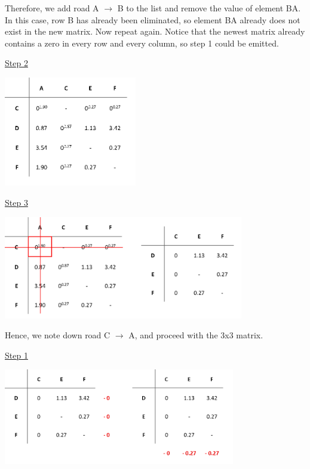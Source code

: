 \noindent
Therefore, we add road A $\rightarrow$ B to the list and remove the value of element BA. In this case, row B has already been eliminated, so element BA already does not exist in the new matrix. Now repeat again. Notice that the newest matrix already contains a zero in every row and every column, so step 1 could be emitted.

\vspace{5mm}
\underline{Step 2}
\vspace{-3mm}
\begin{center}
	\includegraphics[height=4.8cm]{3pen}
\end{center}	

\underline{Step 3}
\vspace{-2mm}
\begin{center}
	\includegraphics[height=4.5cm]{3elim4}
\end{center}

\noindent
Hence, we note down road C $\rightarrow$ A, and proceed with the 3x3 matrix.


\vspace{5mm}
\underline{Step 1} 

\begin{center}
	\includegraphics[height=4.2cm]{4red0} 
\end{center}	


